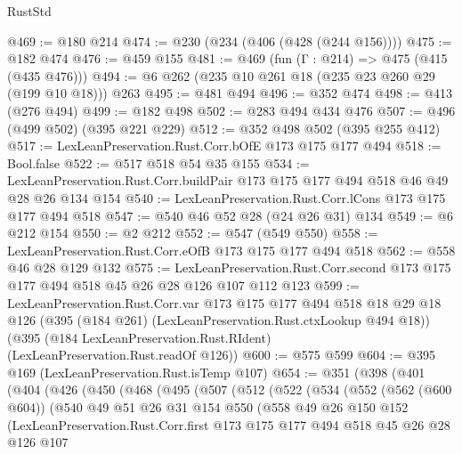 \begin{lexlean}{RustStd}
\begin{coremodule}
@469 := @180 @214
@474 := @230 (@234 (@406 (@428 (@244 @156))))
@475 := @182 @474
@476 := @459 @155
@481 := @469 (fun (Γ : @214) => @475 (@415 (@435 @476)))
@494 := @6 @262 (@235 @10 @261 @18 (@235 @23 @260 @29 (@199 @10 @18))) @263
@495 := @481 @494
@496 := @352 @474
@498 := @413 (@276 @494)
@499 := @182 @498
@502 := @283 @494 @434 @476
@507 := @496 (@499 @502) (@395 @221 @229)
@512 := @352 @498 @502 (@395 @255 @412)
@517 := LexLeanPreservation.Rust.Corr.bOfE @173 @175 @177 @494
@518 := Bool.false
@522 := @517 @518 @54 @35 @155
@534 := LexLeanPreservation.Rust.Corr.buildPair @173 @175 @177 @494 @518 @46 @49 @28 @26 @134 @154
@540 := LexLeanPreservation.Rust.Corr.lCons @173 @175 @177 @494 @518
@547 := @540 @46 @52 @28 (@24 @26 @31) @134
@549 := @6 @212 @154
@550 := @2 @212
@552 := @547 (@549 @550)
@558 := LexLeanPreservation.Rust.Corr.eOfB @173 @175 @177 @494 @518
@562 := @558 @46 @28 @129 @132
@575 := LexLeanPreservation.Rust.Corr.second
    @173
    @175
    @177
    @494
    @518
    @45
    @26
    @28
    @126
    @107
    @112
    @123
@599 := LexLeanPreservation.Rust.Corr.var
    @173
    @175
    @177
    @494
    @518
    @18
    @29
    @18
    @126
    (@395 (@184 @261) (LexLeanPreservation.Rust.ctxLookup @494 @18))
    (@395 (@184 LexLeanPreservation.Rust.RIdent) (LexLeanPreservation.Rust.readOf @126))
@600 := @575 @599
@604 := @395 @169 (LexLeanPreservation.Rust.isTemp @107)
@654 := @351
    (@398
      (@401
        (@404
          (@426
            (@450
              (@468
                (@495
                  (@507
                    (@512
                      (@522
                        (@534
                          (@552
                            (@562 (@600 @604))
                            (@540
                              @49
                              @51
                              @26
                              @31
                              @154
                              @550
                              (@558
                                @49
                                @26
                                @150
                                @152
                                (LexLeanPreservation.Rust.Corr.first
                                  @173
                                  @175
                                  @177
                                  @494
                                  @518
                                  @45
                                  @26
                                  @28
                                  @126
                                  @107

\end{coremodule}
\end{lexlean}
